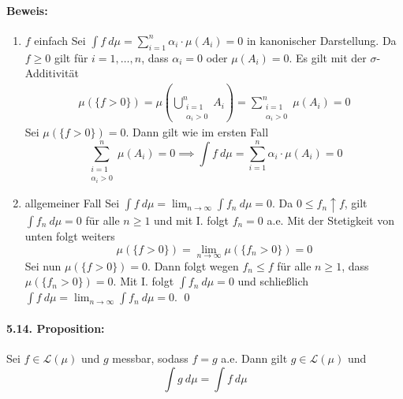   \paragraph{Beweis:}
  \begin{enumerate}[label=\Roman*.]
      \item $f$ einfach\newline
      Sei $\int f\ d\mu=\sum_{i=1}^n\alpha_i\cdot\mu(A_i)=0$ in kanonischer Darstellung. Da $f\geq0$ gilt f\"ur $i=1,\hdots,n$, dass $\alpha_i=0$ oder $\mu(A_i)=0$. \goodbreak
      Es gilt mit der $\sigma$-Additivit\"at
      \begin{align*}
          \mu\left(\{f>0\}
          \right)=\mu\left(\bigcup_{\substack{i=1\\\alpha_i>0}}^n A_i\right)=\sum_{\substack{i=1\\ \alpha_i>0}}^n\mu(A_i)=0
      \end{align*}
      Sei $\mu(\{f>0\})=0$. Dann gilt wie im ersten Fall 
      $$\sum_{\substack{i=1\\ \alpha_i>0}}^n\mu(A_i)=0\implies\int f\ d\mu=\sum_{i=1}^n\alpha_i\cdot\mu(A_i)=0$$
      \item allgemeiner Fall\newline
      Sei $\int f\ d\mu=\lim_{n\to\infty}\int f_n\ d\mu=0$. Da $0\leq f_n\uparrow f$, gilt $\int f_n\ d\mu=0$ f\"ur alle $n\geq1$ und mit I. folgt $f_n=0$ a.e. Mit der Stetigkeit von unten folgt weiters
      $$\mu(\{f>0\})=\lim_{n\to\infty}\mu(\{f_n>0\})=0$$
      Sei nun $\mu(\{f>0\})=0$. Dann folgt wegen $f_n\leq f$ f\"ur alle $n\geq1$, dass $\mu(\{f_n>0\})=0$. Mit I. folgt $\int f_n\ d\mu=0$ und schlie\ss{}lich $\int f\ d\mu=\lim_{n\to\infty}\int f_n\ d\mu=0$. \qed
  \end{enumerate}
  
  \paragraph{5.14. Proposition:}Sei $f\in\mathcal{L}(\mu)$ und $g$ messbar, sodass $f=g$ a.e. Dann gilt $g\in\mathcal{L}(\mu)$ und
  $$\int g\ d\mu=\int f\ d\mu$$
  
